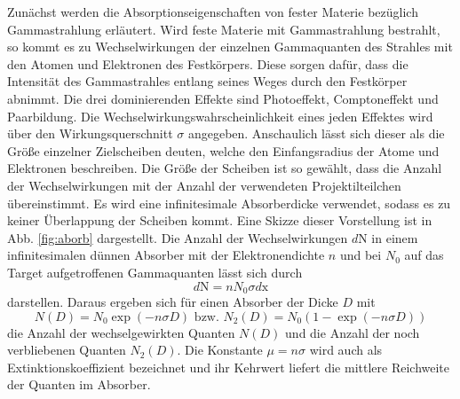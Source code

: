 Zunächst werden die Absorptionseigenschaften von fester Materie bezüglich Gammastrahlung erläutert.
Wird feste Materie mit Gammastrahlung bestrahlt, so kommt es zu Wechselwirkungen der einzelnen Gammaquanten des Strahles mit den Atomen und Elektronen des Festkörpers. Diese sorgen dafür, dass die Intensität des Gammastrahles entlang seines Weges durch den Festkörper abnimmt. Die drei dominierenden Effekte sind Photoeffekt, Comptoneffekt und Paarbildung.
Die Wechselwirkungswahrscheinlichkeit eines jeden Effektes wird über den Wirkungsquerschnitt $\sigma$ angegeben.
 Anschaulich lässt sich dieser als die Größe einzelner Zielscheiben deuten, welche den Einfangsradius der Atome und Elektronen beschreiben. Die Größe der Scheiben ist so gewählt, dass die Anzahl der Wechselwirkungen mit der Anzahl der verwendeten Projektilteilchen  übereinstimmt. Es wird eine infinitesimale Absorberdicke verwendet, sodass es zu keiner Überlappung der Scheiben kommt. Eine Skizze dieser Vorstellung ist in Abb. \ref{fig:aborb} dargestellt.
Die Anzahl der Wechselwirkungen $d\text{N}$ in einem infinitesimalen dünnen Absorber mit der Elektronendichte $n$ und bei $N_0$ auf das Target aufgetroffenen Gammaquanten lässt sich durch
\begin{equation}
    d\text{N} = n N_0 \sigma d\text{x}
\end{equation}
darstellen. Daraus ergeben sich für einen Absorber der Dicke $D$ mit
\begin{equation}
N(D) = N_0 \exp(-n \sigma D) \text{  bzw.  }  N_2(D) = N_0 (1 - \exp(-n \sigma D)) \label{eq:Nd}
\end{equation}
die Anzahl der wechselgewirkten Quanten $N(D)$ und die Anzahl der noch verbliebenen Quanten $N_2(D)$. Die Konstante $ \mu = n \sigma$ wird auch als Extinktionskoeffizient bezeichnet und ihr Kehrwert liefert die mittlere Reichweite der Quanten im Absorber.

